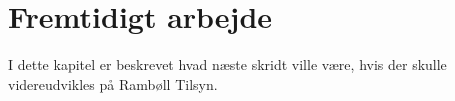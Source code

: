 \chapter{Fremtidigt arbejde}
I dette kapitel er beskrevet hvad næste skridt ville være, hvis der skulle videreudvikles på Rambøll Tilsyn.
